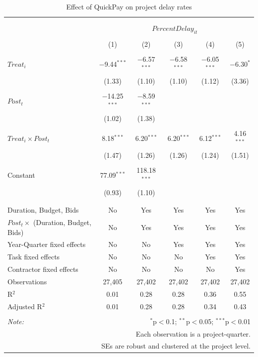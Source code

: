 \documentclass[
]{article}
\begin{document}
\begin{table}[H] \centering 
  \caption{Effect of QuickPay on project delay rates} 
  \label{} 
\small 
\begin{tabular}{@{\extracolsep{-2pt}}lccccc} 
\\[-1.8ex]\hline 
\hline \\[-1.8ex] 
\\[-1.8ex] & \multicolumn{5}{c}{$PercentDelay_{it}$} \\ 
\\[-1.8ex] & (1) & (2) & (3) & (4) & (5)\\ 
\hline \\[-1.8ex] 
 $Treat_i$ & $-$9.44$^{***}$ & $-$6.57$^{***}$ & $-$6.58$^{***}$ & $-$6.05$^{***}$ & $-$6.30$^{*}$ \\ 
  & (1.33) & (1.10) & (1.10) & (1.12) & (3.36) \\ 
  & & & & & \\ 
 $Post_t$ & $-$14.25$^{***}$ & $-$8.59$^{***}$ &  &  &  \\ 
  & (1.02) & (1.38) &  &  &  \\ 
  & & & & & \\ 
 $Treat_i \times Post_t$ & 8.18$^{***}$ & 6.20$^{***}$ & 6.20$^{***}$ & 6.12$^{***}$ & 4.16$^{***}$ \\ 
  & (1.47) & (1.26) & (1.26) & (1.24) & (1.51) \\ 
  & & & & & \\ 
 Constant & 77.09$^{***}$ & 118.18$^{***}$ &  &  &  \\ 
  & (0.93) & (1.10) &  &  &  \\ 
  & & & & & \\ 
\hline \\[-1.8ex] 
Duration, Budget, Bids & No & Yes & Yes & Yes & Yes \\ 
$Post_t \times$  (Duration, Budget, Bids) & No & Yes & Yes & Yes & Yes \\ 
Year-Quarter fixed effects & No & No & Yes & Yes & Yes \\ 
Task fixed effects & No & No & No & Yes & Yes \\ 
Contractor fixed effects & No & No & No & No & Yes \\ 
Observations & 27,405 & 27,402 & 27,402 & 27,402 & 27,402 \\ 
R$^{2}$ & 0.01 & 0.28 & 0.28 & 0.36 & 0.55 \\ 
Adjusted R$^{2}$ & 0.01 & 0.28 & 0.28 & 0.34 & 0.43 \\ 
\hline 
\hline \\[-1.8ex] 
\textit{Note:}  & \multicolumn{5}{r}{$^{*}$p$<$0.1; $^{**}$p$<$0.05; $^{***}$p$<$0.01} \\ 
 & \multicolumn{5}{r}{Each observation is a project-quarter.} \\ 
 & \multicolumn{5}{r}{SEs are robust and clustered at the project level.} \\ 
\end{tabular} 
\end{table}
\end{document}
